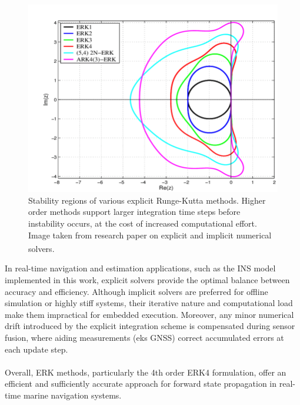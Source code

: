 \begin{figure}[H]
    \centering
    \includegraphics[width=0.9\linewidth]{Pictures/System_Modeling/Numerical_Solvers/StabilityRegionExplicitSolvers.png}
    \caption{Stability regions of various explicit Runge-Kutta methods. Higher order methods support larger integration time steps before instability occurs, at the cost of increased computational effort. Image taken from research paper on explicit and implicit numerical solvers.\textsuperscript{\cite{stability_region_explicit_solvers}}}
    \label{fig:system-modeling-stability-region-explicit-solvers}
\end{figure}
\noindent
In real-time navigation and estimation applications, such as the INS model implemented in this work, explicit solvers provide the optimal balance between accuracy and efficiency. Although implicit solvers are preferred for offline simulation or highly stiff systems, their iterative nature and computational load make them impractical for embedded execution. Moreover, any minor numerical drift introduced by the explicit integration scheme is compensated during sensor fusion, where aiding measurements (eks GNSS) correct accumulated errors at each update step.  
\\ \\
Overall, ERK methods, particularly the 4th order ERK4 formulation, offer an efficient and sufficiently accurate approach for forward state propagation in real-time marine navigation systems.



